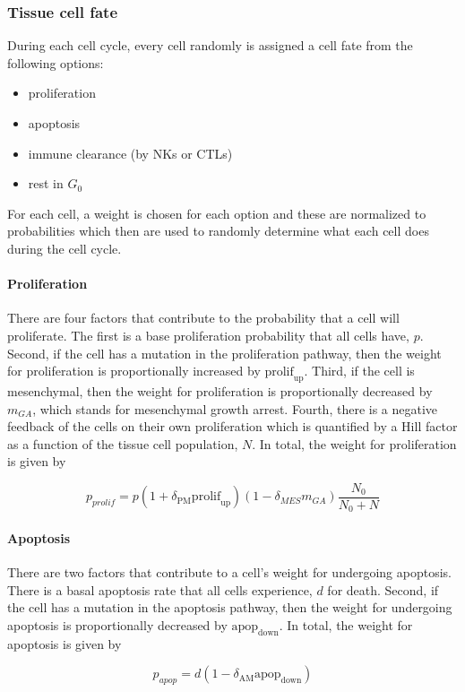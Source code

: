 \documentclass[11pt, preprint]{article}
\begin{document}
\subsubsection{Tissue cell fate}
During each cell cycle, every cell randomly is assigned a cell fate from the following options:
\begin{itemize}
\item proliferation
\item apoptosis
\item immune clearance (by NKs or CTLs)
\item rest in $G_0$
\end{itemize}

For each cell, a weight is chosen for each option and these are normalized to probabilities which then are used to randomly determine what each cell does during the cell cycle.

\paragraph{Proliferation}
There are four factors that contribute to the probability that a cell will proliferate.
The first is a base proliferation probability that all cells have, $p$.
Second, if the cell has a mutation in the proliferation pathway, then the weight for proliferation is proportionally increased by $\text{prolif}_{\text{up}}$.
Third, if the cell is mesenchymal, then the weight for proliferation is proportionally decreased by $m_{GA}$, which stands for mesenchymal growth arrest.
Fourth, there is a negative feedback of the cells on their own proliferation which is quantified by a Hill factor as a function of the tissue cell population, $N$.
In total, the weight for proliferation is given by

$$ p_{prolif} = p(1+\delta_{\text{PM}}\text{prolif}_{\text{up}})(1-\delta_{MES}m_{GA})\frac{N_0}{N_0+N} $$

\paragraph{Apoptosis}
There are two factors that contribute to a cell's weight for undergoing apoptosis.
There is a basal apoptosis rate that all cells experience, $d$ for death.
Second, if the cell has a mutation in the apoptosis pathway, then the weight for undergoing apoptosis is proportionally decreased by $\text{apop}_{\text{down}}$.
In total, the weight for apoptosis is given by 

$$ p_{apop} = d(1-\delta_{\text{AM}}\text{apop}_{\text{down}}) $$
\end{document}
